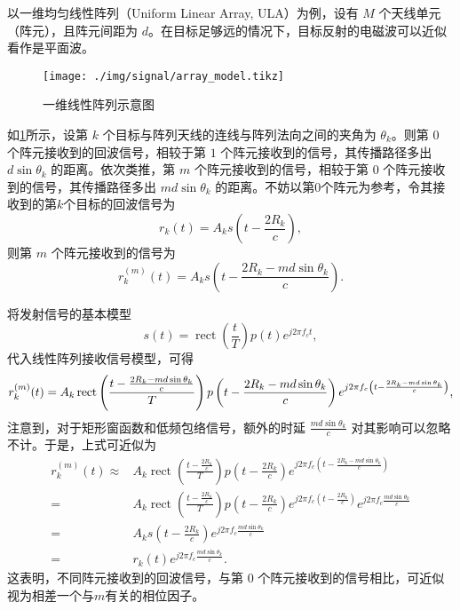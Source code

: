 以一维均匀线性阵列（Uniform Linear Array, ULA）为例，设有 $M$ 个天线单元（阵元），且阵元间距为 $d$。在目标足够远的情况下，目标反射的电磁波可以近似看作是平面波。

\begin{figure}[htb!]
    \centering
    \texttt{[image: ./img/signal/array\_model.tikz]}
    \caption{一维线性阵列示意图}
    \label{fig_array}
\end{figure}

如\cref{fig_array}所示，设第 $k$ 个目标与阵列天线的连线与阵列法向之间的夹角为 $\theta_k$。则第 $0$ 个阵元接收到的回波信号，相较于第 $1$ 个阵元接收到的信号，其传播路径多出 $d \sin\theta_k$ 的距离。依次类推，第 $m$ 个阵元接收到的信号，相较于第 $0$ 个阵元接收到的信号，其传播路径多出 $m d \sin\theta_k$ 的距离。不妨以第0个阵元为参考，令其接收到的第\( k \)个目标的回波信号为
\[
    r_k(t) = A_k s\left(t - \frac{2 R_k}{c}\right),
\]
则第 $m$ 个阵元接收到的信号为
\[
    r_k^{(m)}(t) = A_k s\left(t - \frac{2 R_k - m d \sin\theta_k}{c}\right).
\]

将发射信号的基本模型
\[
    s(t) = \operatorname{rect}\left(\frac{t}{T}\right) p(t) e^{j 2 \pi f_c t},
\]
代入线性阵列接收信号模型，可得
\[
    \small
    r_k^{(m)}(t) = A_k \operatorname{rect}\left(\frac{t - \frac{2 R_k - m d \sin\theta_k}{c}}{T}\right)
    p\left(t - \frac{2 R_k - m d \sin\theta_k}{c}\right)
    e^{j 2 \pi f_c \left(t - \frac{2 R_k - m d \sin\theta_k}{c}\right)},
\]
注意到，对于矩形窗函数和低频包络信号，额外的时延 $\frac{m d \sin\theta_k}{c}$ 对其影响可以忽略不计。于是，上式可近似为
\[
    \begin{split}
        r_k^{(m)}(t) \approx & A_k \operatorname{rect}\left(\frac{t - \frac{2 R_k}{c}}{T}\right)
        p\left(t - \frac{2 R_k}{c}\right)
        e^{j 2 \pi f_c \left(t - \frac{2 R_k - m d \sin\theta_k}{c}\right)}                      \\
        =                    & A_k \operatorname{rect}\left(\frac{t - \frac{2 R_k}{c}}{T}\right)
        p\left(t - \frac{2 R_k}{c}\right)
        e^{j 2 \pi f_c \left(t - \frac{2 R_k}{c}\right)}
        e^{j 2 \pi f_c \frac{m d \sin\theta_k}{c}}                                               \\
        =                    & A_k s\left(t - \frac{2 R_k}{c}\right)
        e^{j 2 \pi f_c \frac{m d \sin\theta_k}{c}}                                               \\
        =                    & r_k(t) e^{j 2 \pi f_c \frac{m d \sin\theta_k}{c}}.
    \end{split}
\]
这表明，不同阵元接收到的回波信号，与第 0 个阵元接收到的信号相比，可近似视为相差一个与\( m \)有关的相位因子。

